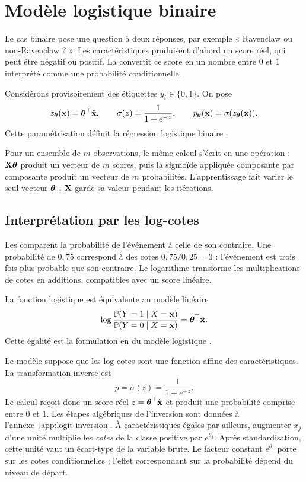 \chapter{Modèle logistique binaire}
\label{ch:binary}

\begin{lecture}
Le cas binaire pose une question à deux réponses, par exemple « Ravenclaw ou
non-Ravenclaw ? ». Les caractéristiques produisent d'abord un score réel, qui
peut être négatif ou positif. La  convertit ce score en un nombre entre
$0$ et $1$ interprété comme une probabilité conditionnelle.
\end{lecture}

Considérons provisoirement des étiquettes $y_i\in\{0,1\}$. On pose
\[
  z_{\boldsymbol{\theta}}(\mathbf{x})=\boldsymbol{\theta}^\top\tilde{\mathbf{x}},
  \qquad
  \sigma(z)=\frac1{1+e^{-z}},
  \qquad
  p_{\boldsymbol{\theta}}(\mathbf{x})=\sigma(z_{\boldsymbol{\theta}}(\mathbf{x})).
\]
Cette paramétrisation définit la régression logistique binaire
\cite[sec.~4.4]{hastie2009,cox1958}.

Pour un ensemble de $m$ observations, le même calcul s'écrit en une opération :
$\mathbf{X}\boldsymbol{\theta}$ produit un vecteur de $m$ scores, puis la sigmoïde appliquée composante
par composante produit un vecteur de $m$ probabilités. L'apprentissage fait
varier le seul vecteur $\boldsymbol{\theta}$ ; $\mathbf{X}$ garde sa valeur pendant les itérations.

\section{Interprétation par les log-cotes}

\begin{lecture}
Les  comparent la probabilité de l'événement à celle de son contraire. Une
probabilité de $0{,}75$ correspond à des cotes $0{,}75/0{,}25=3$ : l'événement
est trois fois plus probable que son contraire. Le logarithme transforme les
multiplications de cotes en additions, compatibles avec un score linéaire.
\end{lecture}

La fonction logistique est équivalente au modèle linéaire
\[
  \log\frac{\mathbb{P}(Y=1\mid X=\mathbf{x})}{\mathbb{P}(Y=0\mid X=\mathbf{x})}
  =\boldsymbol{\theta}^\top\tilde{\mathbf{x}}.
\]
Cette égalité est la formulation en  du modèle logistique
\cite[équations~4.17--4.18]{hastie2009}.

Le modèle suppose que les log-cotes sont une fonction affine des
caractéristiques. La transformation inverse est
\[
  p=\sigma(z)=\frac{1}{1+e^{-z}}.
\]
Le calcul reçoit donc un score réel $z=\boldsymbol{\theta}^\top\tilde{\mathbf{x}}$ et produit une probabilité
comprise entre $0$ et $1$. Les étapes algébriques de l'inversion sont données à
l'annexe~\ref{app:logit-inversion}.
À caractéristiques égales par ailleurs, augmenter $x_j$ d'une unité multiplie les
\emph{cotes} de la classe positive par $e^{\theta_j}$. Après standardisation,
cette unité vaut un écart-type de la variable brute. Le facteur constant
$e^{\theta_j}$ porte sur les cotes conditionnelles ; l'effet correspondant sur la
probabilité dépend du niveau de départ.

